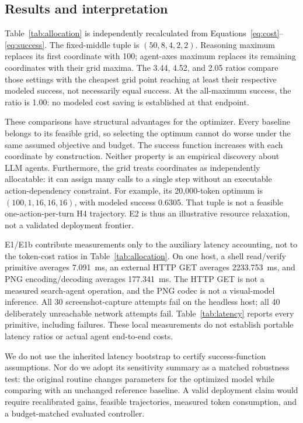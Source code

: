 \documentclass[11pt]{article}
\begin{document}
\subsection{Results and interpretation}

Table~\ref{tab:allocation} is independently recalculated from Equations~\ref{eq:cost}--\ref{eq:success}. The fixed-middle tuple is $(50,8,4,2,2)$. Reasoning maximum replaces its first coordinate with 100; agent-axes maximum replaces its remaining coordinates with their grid maxima. The 3.44, 4.52, and 2.05 ratios compare those settings with the cheapest grid point reaching at least their respective modeled success, not necessarily equal success. At the all-maximum success, the ratio is 1.00: no modeled cost saving is established at that endpoint.

These comparisons have structural advantages for the optimizer. Every baseline belongs to its feasible grid, so selecting the optimum cannot do worse under the same assumed objective and budget. The success function increases with each coordinate by construction. Neither property is an empirical discovery about LLM agents. Furthermore, the grid treats coordinates as independently allocatable: it can assign many calls to a single step without an executable action-dependency constraint. For example, its 20,000-token optimum is $(100,1,16,16,16)$, with modeled success 0.6305. That tuple is not a feasible one-action-per-turn H4 trajectory. E2 is thus an illustrative resource relaxation, not a validated deployment frontier.

E1/E1b contribute measurements only to the auxiliary latency accounting, not to the token-cost ratios in Table~\ref{tab:allocation}. On one host, a shell read/verify primitive averages 7.091~ms, an external HTTP GET averages 2233.753~ms, and PNG encoding/decoding averages 177.341~ms. The HTTP GET is not a measured search-agent operation, and the PNG codec is not a visual-model inference. All 30 screenshot-capture attempts fail on the headless host; all 40 deliberately unreachable network attempts fail. Table~\ref{tab:latency} reports every primitive, including failures. These local measurements do not establish portable latency ratios or actual agent end-to-end costs.

We do not use the inherited latency bootstrap to certify success-function assumptions. Nor do we adopt its sensitivity summary as a matched robustness test: the original routine changes parameters for the optimized model while comparing with an unchanged reference baseline. A valid deployment claim would require recalibrated gains, feasible trajectories, measured token consumption, and a budget-matched evaluated controller.
\end{document}

